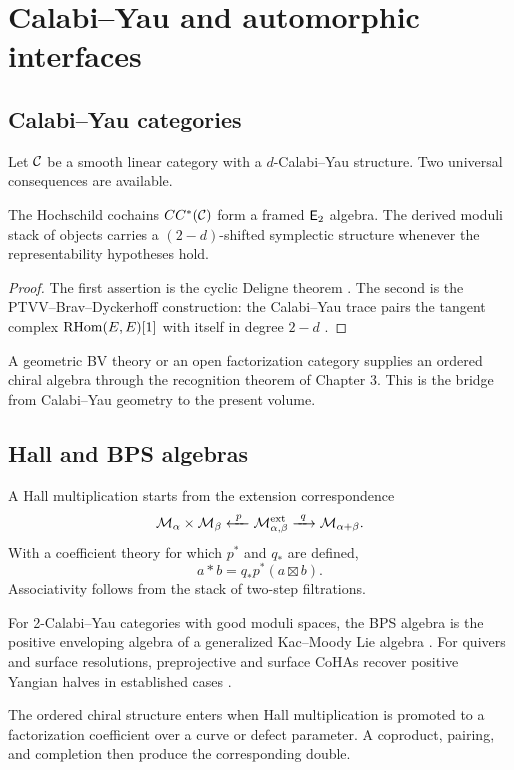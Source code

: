 \part{Calabi--Yau and automorphic interfaces}

\chapter{Calabi--Yau categories}
Let $\mathcal C$ be a smooth linear category with a $d$-Calabi--Yau structure. Two universal consequences are available.

\begin{theorem}
The Hochschild cochains $CC^*(\mathcal C)$ form a framed $\mathsf E_2$ algebra. The derived moduli stack of objects carries a $(2-d)$-shifted symplectic structure whenever the representability hypotheses hold.
\end{theorem}
\begin{proof}
The first assertion is the cyclic Deligne theorem \cite{BravRozenblyum}. The second is the PTVV--Brav--Dyckerhoff construction: the Calabi--Yau trace pairs the tangent complex $\operatorname{RHom}(E,E)[1]$ with itself in degree $2-d$ \cite{PTVV,BravDyckerhoff}.
\end{proof}

A geometric BV theory or an open factorization category supplies an ordered chiral algebra through the recognition theorem of Chapter 3. This is the bridge from Calabi--Yau geometry to the present volume.

\chapter{Hall and BPS algebras}
A Hall multiplication starts from the extension correspondence
\[
 \mathcal M_{\alpha}\times\mathcal M_{\beta}
 \xleftarrow{\ p\ }\mathcal M_{\alpha,\beta}^{\mathrm{ext}}
 \xrightarrow{\ q\ }\mathcal M_{\alpha+\beta}.
\]
With a coefficient theory for which $p^*$ and $q_*$ are defined,
\[
 a*b=q_*p^*(a\boxtimes b).
\]
Associativity follows from the stack of two-step filtrations.

For 2-Calabi--Yau categories with good moduli spaces, the BPS algebra is the positive enveloping algebra of a generalized Kac--Moody Lie algebra \cite{DHS}. For quivers and surface resolutions, preprojective and surface CoHAs recover positive Yangian halves in established cases \cite{SVYangians,DPPSSV}.

The ordered chiral structure enters when Hall multiplication is promoted to a factorization coefficient over a curve or defect parameter. A coproduct, pairing, and completion then produce the corresponding double.

